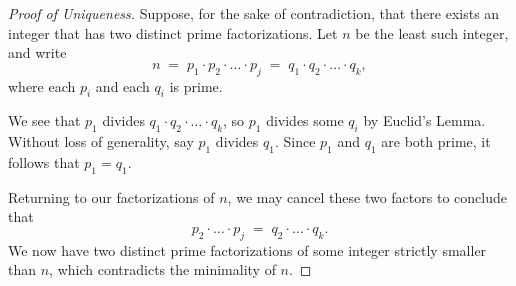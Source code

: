 \documentclass[12pt, a4paper]{article}
\theoremstyle{plain}
\theoremstyle{remark}
\begin{document}
\vspace{0.5em}

\begin{proof}[Proof of Uniqueness]
Suppose, for the sake of contradiction, that there exists an integer that has
two distinct prime factorizations. Let $n$ be the least such integer, and write
\[
    n \;=\; p_1 \cdot p_2 \cdot \ldots \cdot p_j \;=\; q_1 \cdot q_2 \cdot \ldots \cdot q_k,
\]
where each $p_i$ and each $q_i$ is prime.

\medskip
We see that $p_1$ divides $q_1 \cdot q_2 \cdot \ldots \cdot q_k$, so $p_1$ divides some
$q_i$ by Euclid's Lemma. Without loss of generality, say $p_1$ divides $q_1$.
Since $p_1$ and $q_1$ are both prime, it follows that $p_1 = q_1$.

\medskip
Returning to our factorizations of $n$, we may cancel these two factors to
conclude that
\[
    p_2 \cdot \ldots \cdot p_j \;=\; q_2 \cdot \ldots \cdot q_k.
\]
We now have two distinct prime factorizations of some integer strictly smaller
than $n$, which contradicts the minimality of $n$.
\end{proof}
\end{document}
